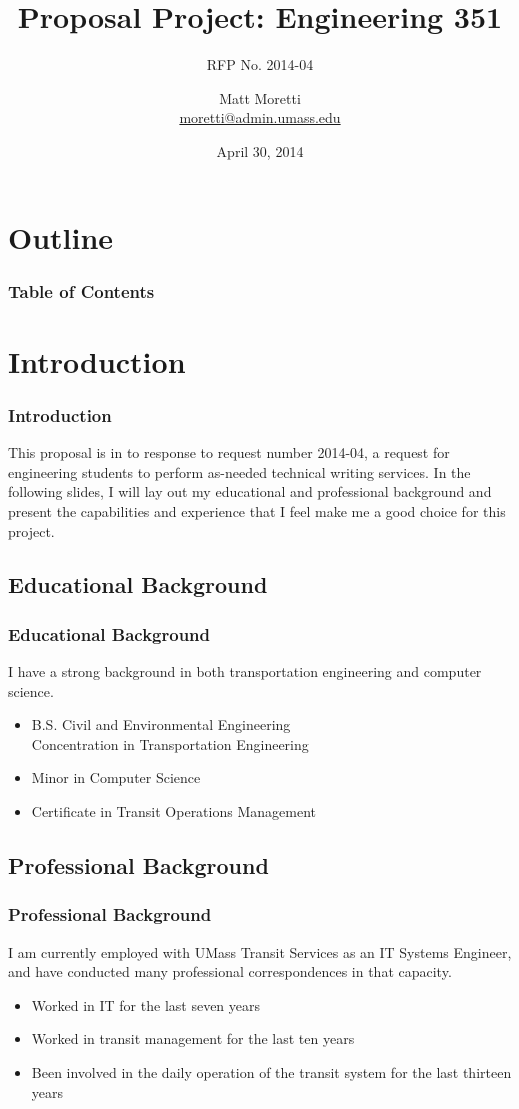 \documentclass{beamer}
\title{Proposal Project: Engineering 351}
\subtitle{RFP No. 2014-04}
\author{Matt Moretti \\
\href{mailto:moretti@admin.umass.edu}%
            {moretti@admin.umass.edu}}
\institute{ENGIN 351 \\
           University of Massachusetts}
\date{April 30, 2014}
\begin{document}
\frame{\titlepage}

\section*{Outline}
\begin{frame}
  \frametitle{Table of Contents}
  \tableofcontents
\end{frame}

\section{Introduction}
\begin{frame}
  \frametitle{Introduction}
  This proposal is in to response to request number 2014-04, a request for
  engineering students to perform as-needed technical writing services.  In
  the following slides, I will lay out my educational and professional
  background and present the capabilities and experience that I feel make me
  a good choice for this project.
\end{frame}

\subsection{Educational Background}
\begin{frame}
  \frametitle{Educational Background}

  I have a strong background in both transportation engineering and computer
  science.

  \begin{itemize}
    \item B.S. Civil and Environmental Engineering \\
      Concentration in Transportation Engineering
    \item Minor in Computer Science
    \item Certificate in Transit Operations Management
  \end{itemize}
\end{frame}

\subsection{Professional Background}
\begin{frame}
  \frametitle{Professional Background}

  I am currently employed with UMass Transit Services as an IT Systems Engineer,
  and have conducted many professional correspondences in that capacity.

  \begin{itemize}
    \item Worked in IT for the last seven years
    \item Worked in transit management for the last ten years
    \item Been involved in the daily operation of the transit system for the
      last thirteen years
  \end{itemize}
\end{frame}
\end{document}
